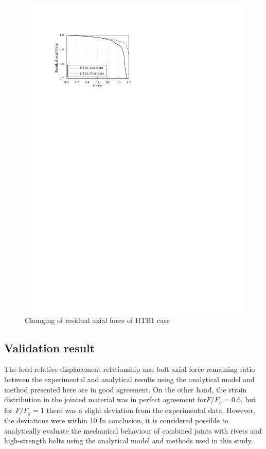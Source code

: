 \begin{figure}
\begin{minipage}[t]{0.48\textwidth}
    \includegraphics[width=\linewidth]{imgs/ch4/figA7.pdf}
    \caption{Changing of residual axial force of HTB1 case}
    \label{ch4figA7}
    \end{minipage}
\end{figure}

\subsection{Validation result}

The load-relative displacement relationship and bolt axial force remaining ratio between the experimental and analytical results using the analytical model and method presented here are in good agreement. On the other hand, the strain distribution in the jointed material was in perfect agreement for$ F / F_y = 0.6$, but for $F / F_y = 1$ there was a slight deviation from the experimental data. However, the deviations were within 10%
In conclusion, it is considered possible to analytically evaluate the mechanical behaviour of combined joints with rivets and high-strength bolts using the analytical model and methods used in this study.


